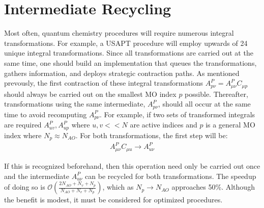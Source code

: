 \section{Intermediate Recycling}

Most often, quantum chemistry procedures will require numerous integral transformations. For example, a USAPT procedure will employ
upwards of 24 unique integral transformations. Since all transformations are carried out at the same time, one should build an 
implementation that queues the transformations, gathers information, and deploys strategic contraction paths.
As mentioned prevously, the first contraction of these integral transformations $A_{p \nu}^P=A_{\mu \nu}^PC_{\mu p}$ 
should always be carried out on the smallest MO index $p$ 
possible. Thereafter, transformations using the same intermediate, $A_{p \nu}^P$, should all occur at the same time to avoid
recomputing $A_{p \nu}^P$. 
For example, if two sets of transformed integrals are required $A^P_{u v}, A^P_{up}$ where $u,v << N$ are active 
indices and $p$ is a general MO index where $N_p \approx N_{AO}$. For both transformations, the first step will be:
\begin{align} 
A^P_{\mu \nu}C_{\mu u} \rightarrow A^P_{u \nu} 
\end{align}

\noindent If this is recognized beforehand, then this operation need only be carried out once and 
the intermediate $A^P_{u \nu}$ can be recycled
for both transformations. The speedup of doing so is $\mathcal{O}(\frac{2N_{AO} + N_v + N_p}{N_{AO} + N_v + N_p})$, 
which as $N_p \rightarrow N_{AO}$ approaches
50\%. Although the benefit is modest, it must be considered for optimized procedures.




